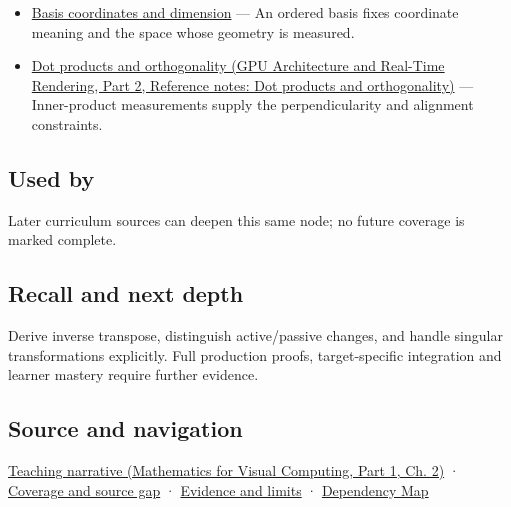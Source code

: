 \hypertarget{appendix-46da295c6787-prerequisites}{}

\begin{itemize}
\tightlist
\item
  \hyperref[appendix-ce0341f7ea0d]{Basis coordinates and dimension} --- An ordered basis fixes coordinate meaning and the space whose geometry is measured.
\item
  \href{../06-GPU-Architecture-and-Real-Time-Rendering-P02/main.pdf\#nameddest=appendix-8bc4e8fc547c}{Dot products and orthogonality (GPU Architecture and Real-Time Rendering, Part 2, Reference notes: Dot products and orthogonality)} --- Inner-product measurements supply the perpendicularity and alignment constraints.
\end{itemize}

\subsection{Used by}\label{appendix-46da295c6787-used-by}

\hypertarget{appendix-46da295c6787-used-by}{}

Later curriculum sources can deepen this same node; no future coverage is marked complete.

\subsection{Recall and next depth}\label{appendix-46da295c6787-recall-and-next-depth}

\hypertarget{appendix-46da295c6787-recall-and-next-depth}{}

Derive inverse transpose, distinguish active/passive changes, and handle singular transformations explicitly. Full production proofs, target-specific integration and learner mastery require further evidence.

\subsection{Source and navigation}\label{appendix-46da295c6787-source-and-navigation}

\hypertarget{appendix-46da295c6787-source-and-navigation}{}

\href{../02-Mathematics-for-Visual-Computing-P01/main.pdf\#nameddest=01-foundations-i-ch018-a-normal-is-a-measuring-rule-before-it-is-an-arrow}{Teaching narrative (Mathematics for Visual Computing, Part 1, Ch. 2)} · \hyperref[appendix-fd090d982a15-phase-6---parts-501-600]{Coverage and source gap} · \hyperref[appendix-a103e7846d21-phase-6---source-analysis-and-verification]{Evidence and limits} · \hyperref[appendix-4ad47bdd269a]{Dependency Map}
